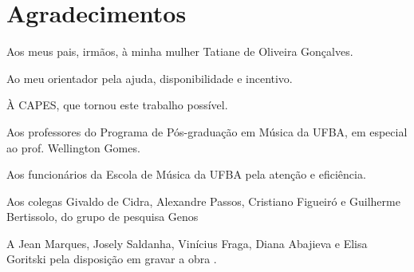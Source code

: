 \chapter*{Agradecimentos}
\label{cha:agradecimentos}

Aos meus pais, irmãos, à minha mulher Tatiane de Oliveira Gonçalves.

Ao meu orientador pela ajuda, disponibilidade e incentivo.

À CAPES, que tornou este trabalho possível.

Aos professores do Programa de Pós-graduação em Música da UFBA, em
especial ao prof. Wellington Gomes.

Aos funcionários da Escola de Música da UFBA pela atenção e
eficiência.

Aos colegas Givaldo de Cidra, Alexandre Passos, Cristiano Figueiró e
Guilherme Bertissolo, do grupo de pesquisa Genos

A Jean Marques, Josely Saldanha, Vinícius Fraga, Diana Abajieva e
Elisa Goritski pela disposição em gravar a obra \obra{}.
